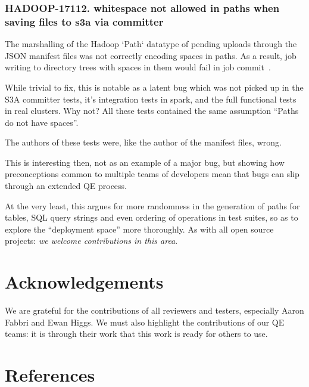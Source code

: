 \documentclass[conference]{IEEEtran}
\begin{document}
\subsubsection{HADOOP-17112. whitespace not allowed in paths when saving files to s3a via committer}

The marshalling of the Hadoop `Path` datatype of pending uploads through the JSON manifest
files was not correctly encoding spaces in paths. As a result, job writing to directory
trees with spaces in them would fail in job commit\ \cite{HADOOP-17112}.

While trivial to fix, this is notable as a latent bug which was not picked
up in the S3A committer tests, it's integration tests in spark, and the full
functional tests in real clusters.
Why not?
All these tests contained the same assumption ``Paths do not have spaces''.

The authors of these tests were, like the author of the manifest files, wrong.

This is interesting then, not as an example of a major bug, but showing how
preconceptions common to multiple teams of developers mean that bugs
can slip through an extended QE process.

At the very least, this argues for more randomness in the generation
of paths for tables, SQL query strings and even ordering of
operations in test suites, so as to explore the ``deployment space''
more thoroughly.
As with all open source projects: \emph{we welcome contributions in this area}.


\section*{Acknowledgements}
\label{sec:acknowledgements}

We are grateful for the contributions of all reviewers and testers, especially
Aaron Fabbri and Ewan Higgs.
We must also highlight the contributions of our QE teams: it is through
their work that this work is ready for others to use.


\section{References}
\label{sec:references}




\end{document}
